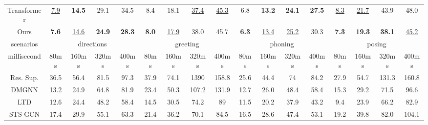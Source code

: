 \begin{table}[h]
{\begin{tabular}{c|cccc|cccc|cccc|cccc}
Transformer & \underline{7.9}           & \textbf{14.5} & 29.1          & 34.5          & 8.4           & 18.1          & \underline{37.4}          & \underline{45.3}           & 6.8           & \textbf{13.2} & \textbf{24.1} & \textbf{27.5} & \underline{8.3}           & \underline{21.7}          & 43.9          & 48.0          \\
Ours   & \textbf{7.6}  & \underline{14.6}          & \textbf{24.9} & \textbf{28.3} & \textbf{8.0}  & \underline{17.9}          & 38.0          & 45.7           & \textbf{6.3}  & \underline{13.4}          & \underline{25.2}          & 30.3          & \textbf{7.3}  & \textbf{19.3} & \textbf{38.1} & \underline{45.2}  \\ \hline
scenarios   & \multicolumn{4}{c|}{directions}                                & \multicolumn{4}{c|}{greeting}                                   & \multicolumn{4}{c|}{phoning}                                   & \multicolumn{4}{c}{posing}                                    \\ \hline
millisecond & 80ms          & 160ms         & 320ms         & 400ms         & 80ms          & 160ms         & 320ms         & 400ms          & 80ms          & 160ms         & 320ms         & 400ms         & 80ms          & 160ms         & 320ms         & 400ms         \\ \hline
Res. Sup.   & 36.5          & 56.4          & 81.5          & 97.3          & 37.9          & 74.1          & 1390          & 158.8          & 25.6          & 44.4          & 74            & 84.2          & 27.9          & 54.7          & 131.3         & 160.8         \\
DMGNN       & 13.2          & 24.9          & 64.8          & 81.9          & 23.4          & 50.3          & 107.2         & 131.9          & 12.7          & 26.0          & 48.4          & 58.4          & 15.3          & 29.2          & 71.5          & 96.6          \\
LTD   & 12.6          & 24.4          & 48.2          & 58.4          & 14.5          & 30.5          & 74.2          & 89             & 11.5          & 20.2          & 37.9          & 43.2          & 9.4           & 23.9          & 66.2          & 82.9          \\
STS-GCN              & 17.4                 & 29.9                 & 55.1                 & 63.3                          & 21.4                 & 36.2                 & 70.1                 & 84.5                 & 16.5                 & 28.6                 & 47.4                 & 53.1                 & 19.2                 & 39.8                 & 82.0                 & 104.1\\

\end{tabular}}
\end{table}
